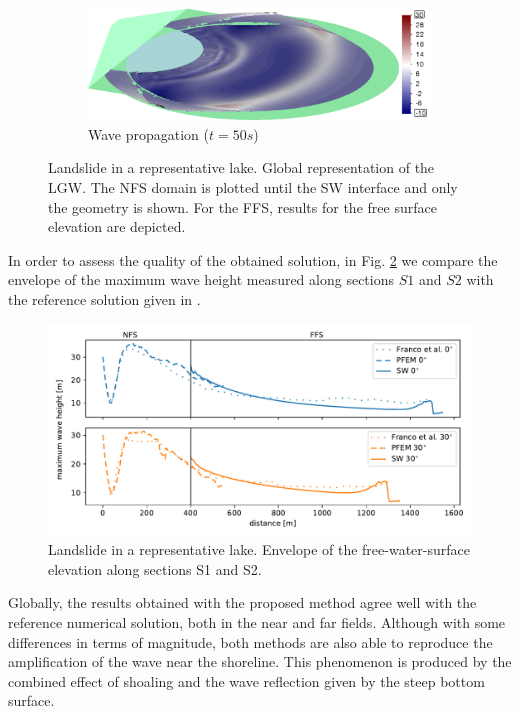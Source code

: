 \begin{figure} [p]
    \begin{subfigure}{\textwidth}
        \caption{Wave propagation ($t=50s$)}
        \hfill
        \includegraphics[width=.9\textwidth]{img/coupling/ex3_t50.png}
    \end{subfigure}
    \caption{Landslide in a representative lake. Global representation of the LGW. The NFS domain is plotted until the SW interface and only the geometry is shown. For the FFS, results for the free surface elevation are depicted.}
    \label{ex3_postprocess}
\end{figure}


In order to assess the quality of the obtained solution, in Fig. \ref{ex3_max_wave_height} we compare the envelope of the maximum wave height measured along sections $S1$ and $S2$ with the reference solution given in \cite{app112411614}.

\begin{figure} [ht]
    \centering
    \includegraphics[width=\textwidth]{img/coupling/ex3_max_wave_height.pdf}
    \caption{Landslide in a representative lake. Envelope of the free-water-surface elevation along sections S1 and S2.}
    \label{ex3_max_wave_height}
\end{figure}

Globally, the results obtained with the proposed method agree well with the reference numerical solution, both in the near and far fields. Although with some differences in terms of magnitude, both methods are also able to reproduce the amplification of the wave near the shoreline. This phenomenon is produced by the combined effect of shoaling and the wave reflection given by the steep bottom surface. 

